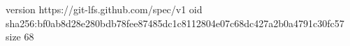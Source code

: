 version https://git-lfs.github.com/spec/v1
oid sha256:bf0ab8d28e280bdb78fee87485dc1c8112804e07c68dc427a2b0a4791c30fc57
size 68
